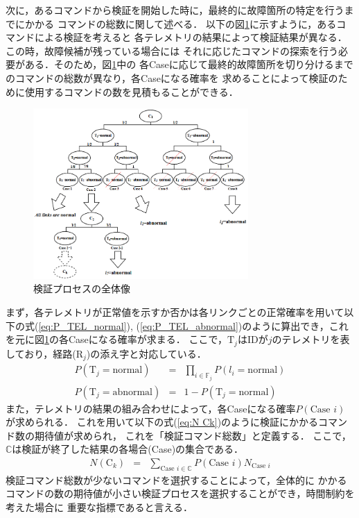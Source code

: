 \documentclass[11pt]{jsarticle}%
\begin{document}
\begin{multicols}{2}
次に，あるコマンドから検証を開始した時に，最終的に故障箇所の特定を行うまでにかかる
コマンドの総数に関して述べる．%
以下の図\ref{fig:all_process}に示すように，あるコマンドによる検証を考えると
各テレメトリの結果によって検証結果が異なる．この時，故障候補が残っている場合には
それに応じたコマンドの探索を行う必要がある．そのため，図\ref{fig:all_process}中の
各Caseに応じて最終的故障箇所を切り分けるまでのコマンドの総数が異なり，各Caseになる確率を
求めることによって検証のために使用するコマンドの数を見積もることができる．
\begin{figure}[H]
  \centering
    \includegraphics[height=6.5cm]{../figure/all_process.png}
    \caption{検証プロセスの全体像}
    \label{fig:all_process}
\end{figure}
まず，各テレメトリが正常値を示すか否かは各リンクごとの正常確率を用いて以下の式(\ref{eq:P_TEL_normal}),
(\ref{eq:P_TEL_abnormal})のように算出でき，これを元に図\ref{fig:all_process}の各Caseになる確率が求まる．
ここで，$\text{T}_j$はIDが$j$のテレメトリを表しており，経路(R$_j$)の添え字と対応している．
\begin{eqnarray}
  P(\text{T}_j = \text{normal}) &=& \prod_{i\in\mathbb{F}_j} P(l_i = \text{normal}) \label{eq:P_TEL_normal}\\
  P(\text{T}_j = \text{abnormal}) &=& 1 - P(\text{T}_j = \text{normal}) \label{eq:P_TEL_abnormal}
\end{eqnarray}
また，テレメトリの結果の組み合わせによって，各Caseになる確率$P(\text{Case }i)$が求められる．
これを用いて以下の式(\ref{eq:N Ck})のように検証にかかるコマンド数の期待値が求められ，
これを「検証コマンド総数」と定義する．
ここで，$\mathbb{C}$は検証が終了した結果の各場合(Case)の集合である．%
\begin{eqnarray}
  N(\text{C}_k) &=& \sum_{\text{Case }i\in\mathbb{C}} P(\text{Case }i) N_{\text{Case }i} \label{eq:N Ck}
\end{eqnarray}
検証コマンド総数が少ないコマンドを選択することによって，全体的に
かかるコマンドの数の期待値が小さい検証プロセスを選択することができ，時間制約を考えた場合に
重要な指標であると言える．


\end{multicols}
\end{document}
